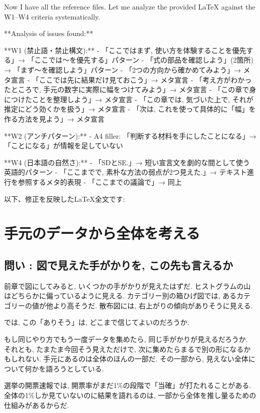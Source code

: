 ﻿Now I have all the reference files. Let me analyze the provided LaTeX against the W1–W4 criteria systematically.

**Analysis of issues found:**

**W1 (禁止語・禁止構文):**
- 「ここではまず, 使い方を体験することを優先する」→ 「ここでは〜を優先する」パターン
- 「式の部品を確認しよう」(2箇所) → 「まず〜を確認しよう」パターン
- 「2つの方向から確かめてみよう」→ メタ宣言
- 「ここでは先に結果だけ見ておこう」→ メタ宣言
- 「考え方がわかったところで, 手元の数字に実際に幅をつけてみよう」→ メタ宣言
- 「この章で身につけたことを整理しよう」→ メタ宣言
- 「この章では, 気づいた上で, それが推定にどう効くかを扱う」→ メタ宣言
- 「次は, これを使って具体的に「幅」を作る方法を見よう」→ メタ宣言

**W2 (アンチパターン):**
- A4 filler: 「判断する材料を手にしたことになる」→ 「ことになる」が情報を足していない

**W4 (日本語の自然さ):**
- 「SDとSE.」→ 短い宣言文を劇的な間として使う英語的パターン
- 「ここまでで, 素朴な方法の弱点が2つ見えた.」→ テキスト進行を参照するメタ的表現
- 「ここまでの議論で」→ 同上

以下、修正を反映したLaTeX全文です:

\section{手元のデータから全体を考える}

  \subsection{問い : 図で見えた手がかりを, この先も言えるか}

    前章で図にしてみると, いくつかの手がかりが見えたはずだ.
    ヒストグラムの山はどちらかに偏っているように見える.
    カテゴリー別の箱ひげ図では, あるカテゴリーの値が他より高そうだ.
    散布図には, 右上がりの傾向がありそうに見える.

    では, この「ありそう」は, どこまで信じてよいのだろうか.

    もし同じやり方でもう一度データを集めたら, 同じ手がかりが見えるだろうか.
    それとも, たまたま今回そう見えただけで, 次に集めたらまるで別の形になるかもしれない.
    手元にあるのは全体のほんの一部だ.
    その一部から, 見えない全体について何かを語ろうとしている.

    選挙の開票速報では, 開票率がまだ1\%の段階で「当確」が打たれることがある.
    全体の1\%しか見ていないのに結果を語れるのは, 一部から全体を推し量るための仕組みがあるからだ.

